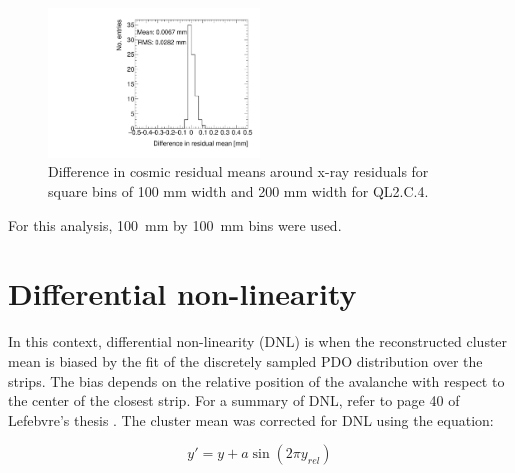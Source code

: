 
\begin{figure}
    \centering
    \includegraphics[width = 0.5\textwidth]{figures/compare_residual_fits_around_xrays_QL2C04_3100V_2021-05-20_100mm_bins_minus_QL2C04_3100V_2021-06-02_200mm_bins_means_difference.pdf}
    \caption{Difference in cosmic residual means around x-ray residuals for square bins of 100 mm width and 200 mm width for QL2.C.4.}
    \label{fig:area_bin_size_mean_diff}
\end{figure}

For this analysis, \SI{100}{\milli\meter} by \SI{100}{\milli\meter} bins were used.

\section{Differential non-linearity}
\label{appendix:systematics_dnl}
In this context, differential non-linearity (DNL) is when the reconstructed cluster mean is biased by the fit of the discretely sampled PDO distribution over the strips. The bias depends on the relative position of the avalanche with respect to the center of the closest strip. For a summary of DNL, refer to page 40 of Lefebvre's thesis \cite{lefebvre_thesis}. The cluster mean was corrected for DNL using the equation:

\begin{equation}
\label{eqn:dnl_corr}
y' = y + a \sin \left( 2 \pi y_{rel} \right)
\end{equation}

